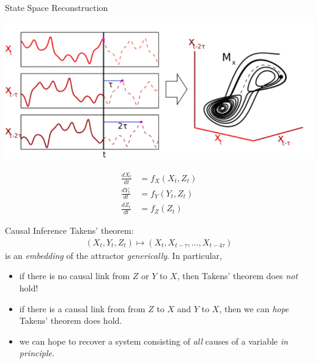 \documentclass[10pt]{beamer}
\begin{document}
\begin{frame}{State Space Reconstruction}
{\begin{center}
\end{center}
 \begin{minipage}[c]{0.6\textwidth}
    	\includegraphics[scale=0.38]{Lorenz2.png}
  \end{minipage} \hfill
   \begin{minipage}[c]{0.3\textwidth}
  \begin{mdframed}[innerleftmargin=0pt, innerrightmargin=0pt, innertopmargin=0pt, innerbottommargin=5pt, linewidth=1pt]
    \begin{align*}
      \frac{dX_t}{dt}&=f_X(X_t, Z_t) \\
      \frac{dY_t}{dt}&=f_Y(Y_t, Z_t) \\
      \frac{dZ_t}{dt}&=f_Z(Z_t)
    \end{align*}
  \end{mdframed}
    \end{minipage}
  
}

\end{frame}
\begin{frame}{Causal Inference}
Takens' theorem:
\begin{align*}
(X_t,Y_t,Z_t)\mapsto \left(X_t,X_{t-\tau},\ldots,X_{t-4\tau}\right)
\end{align*}
is an \textit{embedding} of the attractor \textit{generically}. In particular,
\begin{itemize}
\item<2-> if there is no causal link from $Z$ or $Y$ to $X$, then Takens' theorem does \textit{not} hold!
\item<3-> if there is a causal link from from $Z$ to $X$ and $Y$ to $X$, then we can \textit{hope} Takens' theorem does hold. 
\item<4-> we can hope to recover a system consisting of \textit{all} causes of a variable \textit{in principle}.
\end{itemize}
\end{frame}
\end{document}
